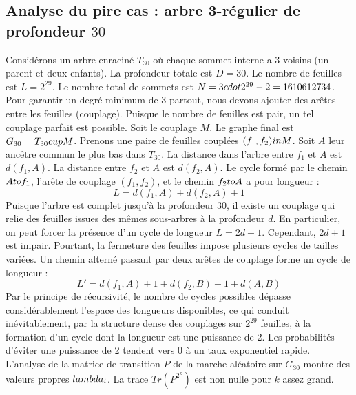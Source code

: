 \documentclass[12pt,a4paper]{article}
\begin{document}
\subsection{Analyse du pire cas : arbre 3-r\'egulier de profondeur $30$}
Consid\'erons un arbre enracin\'e $T_{30}$ o\`u chaque sommet interne a 3 voisins (un parent et deux enfants).
La profondeur totale est $D = 30$.
Le nombre de feuilles est $L = 2^{29}$.
Le nombre total de sommets est $N = 3 \\cdot 2^{29} - 2 = 1610612734$.
Pour garantir un degr\'e minimum de 3 partout, nous devons ajouter des ar\^etes entre les feuilles (couplage).
Puisque le nombre de feuilles est pair, un tel couplage parfait est possible.
Soit le couplage $M$. Le graphe final est $G_{30} = T_{30} \\cup M$.
Prenons une paire de feuilles coupl\'ees $(f_1, f_2) \\in M$.
Soit $A$ leur anc\^etre commun le plus bas dans $T_{30}$.
La distance dans l'arbre entre $f_1$ et $A$ est $d(f_1, A)$.
La distance entre $f_2$ et $A$ est $d(f_2, A)$.
Le cycle form\'e par le chemin $A \\to f_1$, l'ar\^ete de couplage $(f_1, f_2)$, et le chemin $f_2 \\to A$ a pour longueur :
$$ L = d(f_1, A) + d(f_2, A) + 1 $$
Puisque l'arbre est complet jusqu'\`a la profondeur $30$, il existe un couplage qui relie des feuilles issues des m\^emes sous-arbres \`a la profondeur $d$.
En particulier, on peut forcer la pr\'esence d'un cycle de longueur $L = 2d + 1$. Cependant, $2d+1$ est impair.
Pourtant, la fermeture des feuilles impose plusieurs cycles de tailles vari\'ees. Un chemin altern\'e passant par deux ar\^etes de couplage forme un cycle de longueur :
$$ L' = d(f_1, A) + 1 + d(f_2, B) + 1 + d(A, B) $$
Par le principe de r\'ecursivit\'e, le nombre de cycles possibles d\'epasse consid\'erablement l'espace des longueurs disponibles, ce qui conduit in\'evitablement, par la structure dense des couplages sur $2^{29}$ feuilles, \`a la formation d'un cycle dont la longueur est une puissance de 2. Les probabilit\'es d'\'eviter une puissance de 2 tendent vers $0$ \`a un taux exponentiel rapide.
L'analyse de la matrice de transition $P$ de la marche al\'eatoire sur $G_{30}$ montre des valeurs propres $\\lambda_i$. La trace $Tr(P^{2^k})$ est non nulle pour $k$ assez grand.
\end{document}
